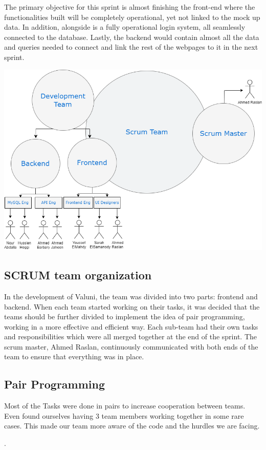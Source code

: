 \documentclass{article}
\begin{document}
\begin{landscape}
\normalsize  

The primary objective for this sprint is almost finishing the front-end where the functionalities built will be completely operational, yet not linked to the mock up data. In addition, alongside is a fully operational login system, all seamlessly connected to the database. Lastly, the backend would contain almost all the data and queries needed to connect and link the rest of the webpages to it in the next sprint. 



\begin{center} 
  \includegraphics[scale=0.35]{"../../Milestone_2/Diagrams/ScrumTeam.png"}
\end{center}

\subsection{SCRUM team organization}  

\quad In the development of Valuni, the team was divided into two parts: frontend and backend. When each team started working on their tasks, it was decided that the teams should be further divided to implement the idea of pair programming, working in a more effective and efficient way. Each sub-team had their own tasks and responsibilities which were all merged together at the end of the sprint. The scrum master, Ahmed Raslan, continuously communicated with both ends of the team to ensure that everything was in place. 

\subsection{Pair Programming}
\quad Most of the Tasks were done in pairs to increase cooperation between teams. Even found ourselves having 3 team members working together in some rare cases. This made our team more aware of the code and the hurdles we are facing.



\end{landscape} 
\restoregeometry.
\end{document}
